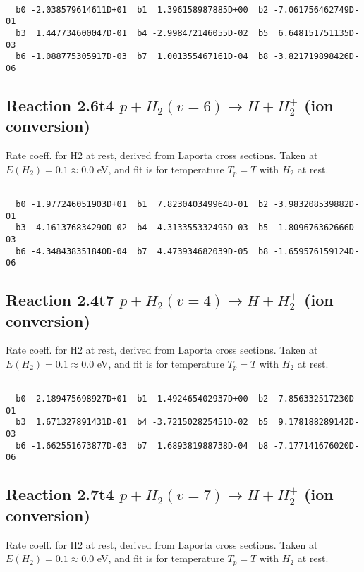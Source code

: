 \begin{small}\begin{verbatim}

  b0 -2.038579614611D+01  b1  1.396158987885D+00  b2 -7.061756462749D-01
  b3  1.447734600047D-01  b4 -2.998472146055D-02  b5  6.648151751135D-03
  b6 -1.088775305917D-03  b7  1.001355467161D-04  b8 -3.821719898426D-06

\end{verbatim}\end{small}

\newpage
\subsection{
Reaction 2.6t4
$ p + H_2(v=6) \rightarrow H + H_2^+$ (ion conversion)
}
Rate coeff. for H2 at rest, derived from Laporta cross sections.
Taken at $E(H_2) = 0.1 \approx 0.0$ eV,  and fit is for temperature $T_p=T$ with $H_2$ at rest.

\begin{small}\begin{verbatim}

  b0 -1.977246051903D+01  b1  7.823040349964D-01  b2 -3.983208539882D-01
  b3  4.161376834290D-02  b4 -4.313355332495D-03  b5  1.809676362666D-03
  b6 -4.348438351840D-04  b7  4.473934682039D-05  b8 -1.659576159124D-06

\end{verbatim}\end{small}

\newpage
\subsection{
Reaction 2.4t7
$ p + H_2(v=4) \rightarrow H + H_2^+$ (ion conversion)
}
Rate coeff. for H2 at rest, derived from Laporta cross sections.
Taken at $E(H_2) = 0.1 \approx 0.0$ eV,  and fit is for temperature $T_p=T$ with $H_2$ at rest.

\begin{small}\begin{verbatim}

  b0 -2.189475698927D+01  b1  1.492465402937D+00  b2 -7.856332517230D-01
  b3  1.671327891431D-01  b4 -3.721502825451D-02  b5  9.178188289142D-03
  b6 -1.662551673877D-03  b7  1.689381988738D-04  b8 -7.177141676020D-06

\end{verbatim}\end{small}

\newpage
\subsection{
Reaction 2.7t4
$ p + H_2(v=7) \rightarrow H + H_2^+$ (ion conversion)
}
Rate coeff. for H2 at rest, derived from Laporta cross sections.
Taken at $E(H_2) = 0.1 \approx 0.0$ eV,  and fit is for temperature $T_p=T$ with $H_2$ at rest.

